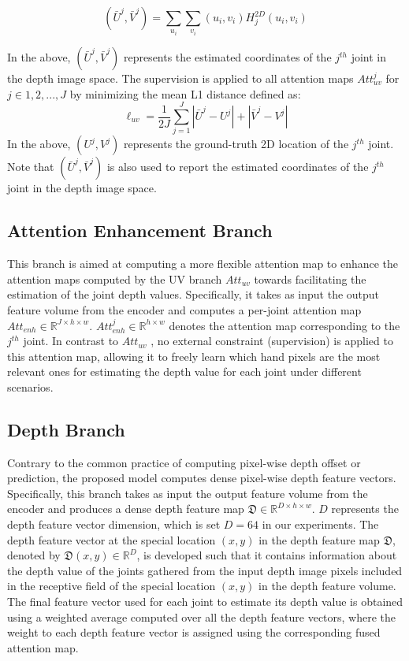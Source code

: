 \documentclass{article}
\begin{document}
\begin{equation}
  (\bar{U}^j,\bar{V}^j) = \sum_{u_i}\sum_{v_i}(u_i,v_i){H}_j^{2D}(u_i,v_i)
\end{equation}

In the above, $(\bar{U}^j,\bar{V}^j)$ represents the estimated coordinates of the $j^{th}$ joint in the depth image space. The supervision is applied to all attention maps $Att_{uv}^j$ for $j \in{1,2,...,J}$ by minimizing the mean L1 distance defined as:
\begin{equation}
  \ell_{uv} = \frac{1}{2J}\sum_{j=1}^J|\bar{U}^j-U^j|+|\bar{V}^j-V^j|
\end{equation}
In the above, $(U^j,V^j)$ represents the ground-truth 2D location of the $j^{th}$ joint. Note that $(\bar{U}^j,\bar{V}^j)$ is also used to report the estimated coordinates of the $j^{th}$ joint in the depth image space. 

\subsection{Attention Enhancement Branch}
This branch is aimed at computing a more flexible attention map to enhance the attention maps computed by the UV branch $Att_{uv}$ towards facilitating the estimation of the joint depth values. Specifically, it takes as input the output feature volume from the encoder and computes a per-joint attention map $Att_{enh} \in{ \mathbb{R}^{J\times{h\times{w}}} }$. $Att_{enh}^j \in{ \mathbb{R}^{h\times{w}} }$ denotes the attention map corresponding to the $j^{th}$ joint. In contrast to $Att_{uv}$ , no external constraint (supervision) is applied to this attention map, allowing it to freely learn which hand pixels are the most relevant ones for estimating the depth value for each joint under different scenarios.


\subsection{Depth Branch}
Contrary to the common practice of computing pixel-wise depth offset or prediction, the proposed model computes dense pixel-wise depth feature vectors. Specifically, this branch takes as input the output feature volume from the encoder and produces a dense depth feature map $\mathfrak{D} \in{\mathbb{R}^{D\times{h\times{w}}}}$. $D$ represents the depth feature vector dimension, which is set $D = 64$ in our experiments. The depth feature vector at the special location $(x,y)$ in the depth feature map $\mathfrak{D}$, denoted by $\mathfrak{D}(x,y) \in{\mathbb{R}^D}$, is developed such that it contains information about the depth value of the joints gathered from the input depth image pixels included in the receptive field of the special location $(x,y)$ in the depth feature volume. The final feature vector used for each joint to estimate its depth value is obtained using a weighted average computed over all the depth feature vectors, where the weight to each depth feature vector is assigned using the corresponding fused attention map.
\end{document}
